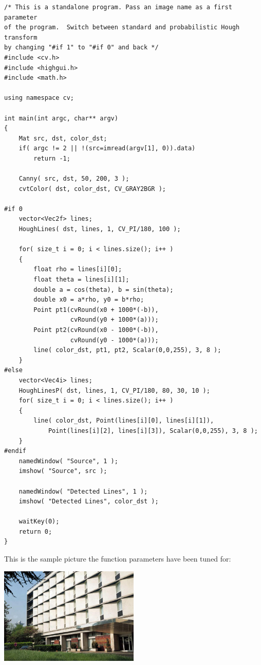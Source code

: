 \begin{lstlisting}
/* This is a standalone program. Pass an image name as a first parameter
of the program.  Switch between standard and probabilistic Hough transform
by changing "#if 1" to "#if 0" and back */
#include <cv.h>
#include <highgui.h>
#include <math.h>

using namespace cv;

int main(int argc, char** argv)
{
    Mat src, dst, color_dst;
    if( argc != 2 || !(src=imread(argv[1], 0)).data)
        return -1;
        
    Canny( src, dst, 50, 200, 3 );
    cvtColor( dst, color_dst, CV_GRAY2BGR );    
        
#if 0
    vector<Vec2f> lines;
    HoughLines( dst, lines, 1, CV_PI/180, 100 );

    for( size_t i = 0; i < lines.size(); i++ )
    {
        float rho = lines[i][0];
        float theta = lines[i][1];
        double a = cos(theta), b = sin(theta);
        double x0 = a*rho, y0 = b*rho;
        Point pt1(cvRound(x0 + 1000*(-b)),
                  cvRound(y0 + 1000*(a)));
        Point pt2(cvRound(x0 - 1000*(-b)),
                  cvRound(y0 - 1000*(a)));
        line( color_dst, pt1, pt2, Scalar(0,0,255), 3, 8 );
    }
#else
    vector<Vec4i> lines;
    HoughLinesP( dst, lines, 1, CV_PI/180, 80, 30, 10 );
    for( size_t i = 0; i < lines.size(); i++ )
    {
        line( color_dst, Point(lines[i][0], lines[i][1]),
            Point(lines[i][2], lines[i][3]), Scalar(0,0,255), 3, 8 );
    }
#endif
    namedWindow( "Source", 1 );
    imshow( "Source", src );

    namedWindow( "Detected Lines", 1 );
    imshow( "Detected Lines", color_dst );

    waitKey(0);
    return 0;
}
\end{lstlisting}


This is the sample picture the function parameters have been tuned for:

\includegraphics[width=0.5\textwidth]{pics/building.jpg}

